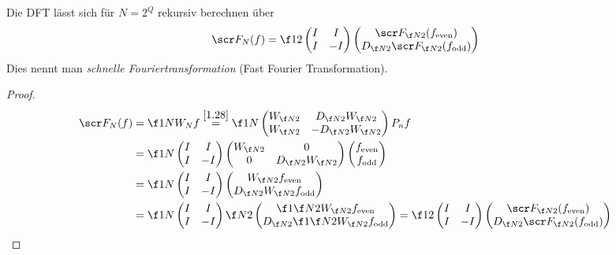 \documentclass[11pt]{scrbook}
\begin{document}
\begin{st} \label{1.29}
	Die DFT lässt sich für $N=2^Q$ rekursiv berechnen über
	\[
		\scr F_N(f) = \f 12 
		\begin{pmatrix}I & I \\ I & -I\end{pmatrix} 
		\begin{pmatrix} \scr F_{\f N2}(f_{\text{even}}) \\ D_{\f N2} \scr F_{\f N2}(f_{\text{odd}})\end{pmatrix}
	\]
	Dies nennt man \emph{schnelle Fouriertransformation} (Fast Fourier Transformation).
	\begin{proof}
		\begin{align*}
			\scr F_N(f) &= \f 1N W_N f 
			\stackrel{\ref{1.28}}= \f 1N \begin{pmatrix}W_{\f N2} & D_{\f N2}W_{\f N2}\\ W_{\f N2} & - D_{\f N2}W_{\f N2} \end{pmatrix} P_n f\\
			&= \f 1N \begin{pmatrix}I & I \\ I & -I\end{pmatrix}\begin{pmatrix}W_{\f N2} & 0 \\ 0 & D_{\f N2}W_{\f N2} \end{pmatrix} \begin{pmatrix} f_{\text{even}} \\ f_{\text{odd}} \end{pmatrix}\\
			&= \f 1N \begin{pmatrix}
				I & I\\ I & -I
			\end{pmatrix}
			\begin{pmatrix}
				W_{\f N2} f_{\text{even}} \\
				D_{\f N2}W_{\f N2} f_{\text{odd}}
			\end{pmatrix}\\
			&= \f 1N \begin{pmatrix}
				I & I \\ I & -I
			\end{pmatrix}
			\f N2
			\begin{pmatrix}
				\f 1{\f N2} W_{\f N2} f_{\text{even}}\\
				D_{\f N2} \f 1{\f N2} W_{\f N2} f_{\text{odd}}
			\end{pmatrix}
			= \f 12 \begin{pmatrix}
				I & I \\ I & -I
			\end{pmatrix}
			\begin{pmatrix}
				\scr F_{\f N2}(f_{\text{even}})\\
				D_{\f N2} \scr F_{\f N2}( f_{\text{odd}})
			\end{pmatrix}
		\end{align*}
	\end{proof}
\end{st}
\end{document}
